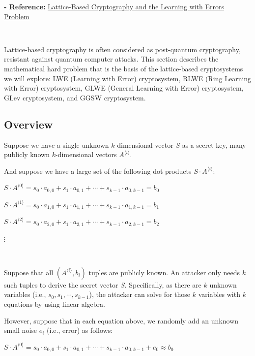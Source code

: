 \textbf{- Reference:} 
\href{https://mysite.science.uottawa.ca/mnevins/papers/StephenHarrigan2017LWE.pdf}{Lattice-Based Cryptography and the Learning with
Errors Problem}~\cite{lattice-crypto}


$ $

Lattice-based cryptography is often considered as  post-quantum cryptography, resistant against quantum computer attacks. This section describes the mathematical hard problem that is the basis of the lattice-based cryptosystems we will explore: LWE (Learning with Error) cryptosystem, RLWE (Ring Learning with Error) cryptosystem, GLWE (General Learning with Error) cryptosystem, GLev cryptosystem, and GGSW cryptosystem.





\subsection{Overview}
\label{subsec:lattice-overview}

Suppose we have a single unknown $k$-dimensional vector $S$ as a secret key, many publicly known $k$-dimensional vectors $A^{\langle i \rangle}$.

And suppose we have a large set of the following dot products $S \cdot A^{\langle i \rangle}$: 

$S \cdot A^{\langle 0 \rangle} = s_0\cdot a_{0,0} + s_1\cdot a_{0,1} + \cdots + s_{k-1}\cdot a_{0,k-1} = b_0$

$S \cdot A^{\langle 1 \rangle} = s_0\cdot a_{1,0} + s_1\cdot a_{1,1} + \cdots + s_{k-1}\cdot a_{1,k-1} = b_1$

$S \cdot A^{\langle 2 \rangle} = s_0\cdot a_{2,0} + s_1\cdot a_{2,1} + \cdots + s_{k-1}\cdot a_{2,k-1} = b_2$

\text{ } $\vdots$


$ $

Suppose that all $(A^{\langle i \rangle}, b_i)$ tuples are publicly known. An attacker only needs $k$ such tuples to derive the secret vector $S$. Specifically, as there are $k$ unknown variables (i.e., $s_0, s_1, \cdots, s_{k-1}$), the attacker can solve for those $k$ variables with $k$ equations by using linear algebra. 

However, suppose that in each equation above, we randomly add an unknown small noise $e_i$ (i.e., error) as follows: 

$S \cdot A^{\langle 0 \rangle} = s_0\cdot a_{0,0} + s_1\cdot a_{0,1} + \cdots + s_{k-1}\cdot a_{0,k-1} + e_0 \approx b_0$


